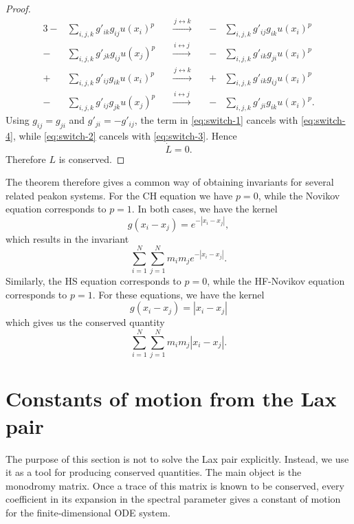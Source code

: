 \documentclass[english,master]{liumaiex}
\theoremstyle{thesisplain}
\theoremstyle{thesisdefinition}
\numberwithin{equation}{section}
\begin{document}
\begin{proof}
	\begin{alignat}{3}
		-&\sum_{i,j,k} g'_{ik}g_{ij}u(x_i)^p
		&\quad \xrightarrow{\,j \leftrightarrow k\,} \quad&
		-&\sum_{i,j,k} g'_{ij}g_{ik}u(x_i)^p
		\label{eq:switch-1}
		\\[0.7em]
		-&\sum_{i,j,k} g'_{jk}g_{ij}u(x_j)^p
		&\quad \xrightarrow{\,i \leftrightarrow j\,} \quad&
		-&\sum_{i,j,k} g'_{ik}g_{ji}u(x_i)^p
		\label{eq:switch-2}
		\\[0.7em]
		+&\sum_{i,j,k} g'_{ij}g_{ik}u(x_i)^p
		&\quad \xrightarrow{\,j \leftrightarrow k\,} \quad&
		+&\sum_{i,j,k} g'_{ik}g_{ij}u(x_i)^p
		\label{eq:switch-3}
		\\[0.7em]
		-&\sum_{i,j,k} g'_{ij}g_{jk}u(x_j)^p
		&\quad \xrightarrow{\,i \leftrightarrow j\,} \quad&
		-&\sum_{i,j,k} g'_{ji}g_{ik}u(x_i)^p .
		\label{eq:switch-4}
	\end{alignat}
	Using $g_{ij}=g_{ji}$ and $g'_{ji}=-g'_{ij}$, the term in \eqref{eq:switch-1} cancels with \eqref{eq:switch-4}, while \eqref{eq:switch-2} cancels with \eqref{eq:switch-3}. Hence
	\[
		\dot{L} = 0.
	\]
	Therefore $L$ is conserved.
\end{proof}

The theorem therefore gives a common way of obtaining invariants for several related peakon systems. For the CH equation we have $p=0$, while the Novikov equation corresponds to $p=1$. In both cases, we have the kernel
\begin{equation}
	g(x_i-x_j)=e^{-|x_i-x_j|},
\end{equation}
which results in the invariant
\begin{equation}
	\sum_{i=1}^{N}\sum_{j=1}^{N}
	m_i m_j e^{-|x_i-x_j|}.
\end{equation}
Similarly, the HS equation corresponds to $p=0$, while the HF-Novikov equation corresponds to $p=1$. For these equations, we have the kernel
\begin{equation}
	g(x_i-x_j)=|x_i-x_j|
\end{equation}
which gives us the conserved quantity
\begin{equation}
	\sum_{i=1}^{N}\sum_{j=1}^{N}
	m_i m_j |x_i-x_j|.
\end{equation}
\section{Constants of motion from the Lax pair} \label{sec:ConstantsLaxPair}

The purpose of this section is not to solve the Lax pair explicitly. Instead, we use it as a tool for producing conserved quantities. The main object is the monodromy matrix. Once a trace of this matrix is known to be conserved, every coefficient in its expansion in the spectral parameter gives a constant of motion for the finite-dimensional ODE system.
\end{document}
